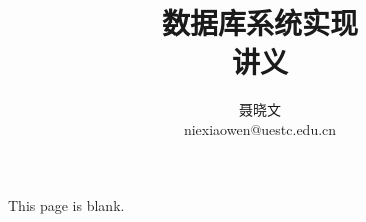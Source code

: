 \documentclass{book}
\begin{document}
\title{数据库系统实现\\讲义}
\author{聂晓文\\niexiaowen@uestc.edu.cn}
\maketitle
\thispagestyle{empty}
This page is blank.

\frontmatter


\tableofcontents

\mainmatter
\raggedbottom
% 

\printbibliography[heading=bibintoc]

\appendix
\end{document}
